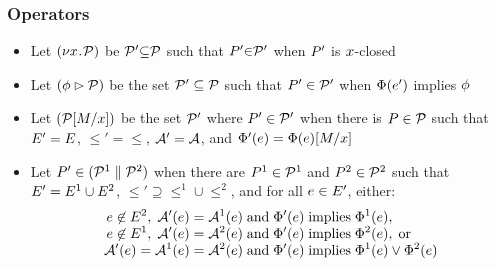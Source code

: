 \documentclass[t,aspectratio=169]{beamer} %
\begin{document}
\begin{frame}
  \frametitle{Operators}
  \begin{itemize}[<+->]
  \item 
    Let $(\nu x\!\mathbin.\!\mathcal{P})$ be  $\mathcal{P}'{\subseteq}\mathcal{P}$ such that $P'{\in}\mathcal{P}'$
    when $P'$ is $x$-closed
  \item 
    Let $(\phi \mathbin\rhd \mathcal{P})$ be the set $\mathcal{P}'\subseteq\mathcal{P}$ such that
    $P'\in\mathcal{P}'$ when $\Phi(e')$ implies $\phi$
  \item 
    Let $(\mathcal{P}[M/x])$
    be the set $\mathcal{P}'$ where $P'\in\mathcal{P}'$ when there is
    $P\in\mathcal{P}$ such that\\ $E' = E$, ${\le'} = {\le}$,
    $\mathcal{A}' = \mathcal{A}$, and
    $\Phi'(e) = \Phi(e)[M/x]$
    
    
  \item 
    Let $P' \in (\mathcal{P}^1 \parallel \mathcal{P}^2)$ when there are
    $P^1 \in \mathcal{P}^1$ and $P^2 \in \mathcal{P}^2$ such that
    \\%
    $E' = E^1 \cup E^2$,
    ${\le'}\supseteq{\le^1}\cup{\le^2}$, and for all $e\in E'$, either:
    \begin{gather*}
      \begin{aligned}
        e \not\in E^2,\; \mathcal{A}'(e) &= \mathcal{A}^1(e) \;\allowbreak\text{and}\allowbreak\; \Phi'(e) \; \allowbreak\text{implies}\allowbreak\; \Phi^1(e),
        \\[-1ex]
        e \not\in E^1,\; \mathcal{A}'(e) &= \mathcal{A}^2(e) \;\allowbreak\text{and}\allowbreak\; \Phi'(e) \; \allowbreak\text{implies}\allowbreak\; \Phi^2(e),\; \allowbreak\text{or}\allowbreak\;
        \\[-1ex]
        \mathcal{A}'(e) = \mathcal{A}^1(e) &= \mathcal{A}^2(e) \;\allowbreak\text{and}\allowbreak\; \Phi'(e) \; \allowbreak\text{implies}\allowbreak\; \Phi^1(e) \lor \Phi^2(e)
      \end{aligned}
    \end{gather*}
  \end{itemize}
\end{frame}
\end{document}
